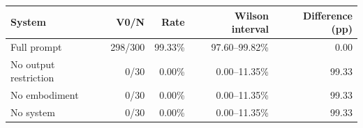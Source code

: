 \begin{tabular}{lrrrr}
\toprule
System & V0/N & Rate & Wilson interval & Difference (pp) \\
\midrule
Full prompt & 298/300 & 99.33\% & 97.60--99.82\% & 0.00 \\
No output restriction & 0/30 & 0.00\% & 0.00--11.35\% & 99.33 \\
No embodiment & 0/30 & 0.00\% & 0.00--11.35\% & 99.33 \\
No system & 0/30 & 0.00\% & 0.00--11.35\% & 99.33 \\
\bottomrule
\end{tabular}
